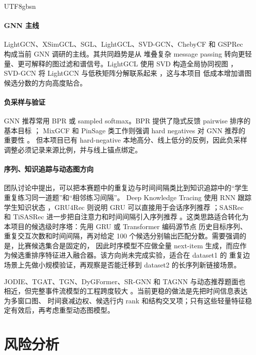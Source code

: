 \documentclass[letterpaper,11pt,leqno]{article}
\begin{document}
\begin{CJK*}{UTF8}{gbsn}
\paragraph{GNN 主线}
LightGCN、XSimGCL、SGL、LightGCL、SVD-GCN、ChebyCF 和 GSPRec 构成当前 GNN 调研的主线。其共同趋势是从
堆叠复杂 message passing 转向更轻量、更可解释的图过滤和谱信号。LightGCL 使用 SVD 构造全局协同视图
\citep{cai2023lightgcl}，SVD-GCN 将 LightGCN 与低秩矩阵分解联系起来 \citep{peng2022svdgcn}，这与本项目
低成本增加谱图候选分数的方向高度贴合。

\paragraph{负采样与验证}
GNN 推荐常用 BPR 或 sampled softmax。BPR 提供了隐式反馈 pairwise 排序的基本目标 \citep{rendle2009bpr}；
MixGCF 和 PinSage 类工作则强调 hard negatives 对 GNN 推荐的重要性 \citep{huang2021mixgcf,ying2018pinsage}。
但本项目已有 hard-negative 本地高分、线上低分的反例，因此负采样调整必须记录来源比例，并与线上锚点绑定。

\paragraph{序列、知识追踪与动态图方向}
团队讨论中提出，可以把本赛题中的重复边与时间间隔类比到知识追踪中的“学生重复练习同一道题”和“相邻练习间隔”。
Deep Knowledge Tracing 使用 RNN 跟踪学生知识状态 \citep{piech2015dkt}，GRU4Rec 则说明 GRU 可以直接用于会话序列推荐
\citep{hidasi2016gru4rec}；SASRec 和 TiSASRec 进一步把自注意力和时间间隔引入序列推荐
\citep{kang2018sasrec,li2020tisasrec}。这类思路适合转化为本项目的候选级时序塔：先用 GRU 或 Transformer 编码源节点
历史目标序列、重复交互次数和时间间隔，再对给定 100 个候选分别输出匹配分数。需要强调的是，比赛候选集合是固定的，
因此时序模型不应做全量 next-item 生成，而应作为候选重排序特征进入融合器。该方向尚未完成实验，适合在 dataset1 的
重复边场景上先做小规模验证，再观察是否能迁移到 dataset2 的长序列新链接场景。

JODIE、TGAT、TGN、DyGFormer、SR-GNN 和 TAGNN 与动态推荐题面也相近，但完整事件流模型的工程跨度较大
\citep{kumar2019jodie,rossi2020tgn,wu2019srgnn,yu2023dygformer}。当前更稳的做法是先把时间信息表达为多窗口图、
时间衰减边权、候选行内 rank 和结构交叉项；只有这些轻量特征稳定有效后，再考虑重型动态图模型。

\section{风险分析}


\end{CJK*}
\end{document}
